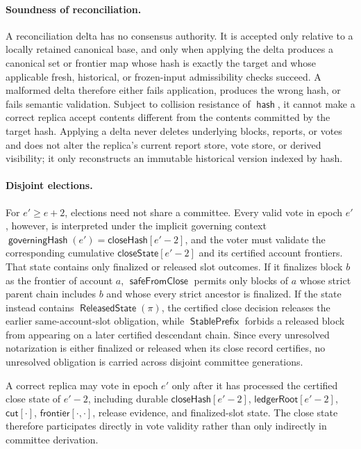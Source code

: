 \documentclass[sigplan,twocolumn,review,anonymous]{acmart}
\newcommand{\func}[1]{\operatorname{\mathsf{#1}}}
\newcommand{\hash}{\func{hash}}
\newcommand{\frontier}{\mathsf{frontier}}
\newcommand{\ledgerRoot}{\mathsf{ledgerRoot}}
\newcommand{\closeHash}{\mathsf{closeHash}}
\newcommand{\closeCut}{\mathsf{cut}}
\newcommand{\closeState}{\mathsf{closeState}}
\newcommand{\governingHash}{\func{governingHash}}
\newcommand{\safeFromClose}{\func{safeFromClose}}
\newcommand{\StablePrefix}{\func{StablePrefix}}
\newcommand{\ReleasedState}{\func{ReleasedState}}
\begin{document}
\paragraph{Soundness of reconciliation.}
A reconciliation delta has no consensus authority.  It is accepted only relative to a locally retained
canonical base, and only when applying the delta produces a canonical set or frontier map whose hash is
exactly the target and whose applicable fresh, historical, or frozen-input admissibility checks succeed.  A malformed delta therefore either
fails application, produces the wrong hash, or fails semantic validation.  Subject to collision
resistance of \(\hash\), it cannot make a correct replica accept contents different from the contents
committed by the target hash.  Applying a delta never deletes underlying blocks, reports, or votes and
does not alter the replica's current report store, vote store, or derived visibility; it only reconstructs
an immutable historical version indexed by hash.

\paragraph{Disjoint elections.}
For \(e'\ge e+2\), elections need not share a committee.  Every valid vote in epoch \(e'\), however,
is interpreted under the implicit governing context
\(\governingHash(e')=\closeHash[e'-2]\), and the voter must validate the corresponding cumulative
\(\closeState[e'-2]\) and its certified account frontiers.  That state contains only finalized or
released slot outcomes.  If it finalizes block \(b\) as the frontier of account \(a\),
\(\safeFromClose\) permits only blocks of \(a\) whose strict parent chain includes \(b\) and whose
every strict ancestor is finalized.  If the state instead contains \(\ReleasedState(\pi)\), the
certified close decision releases the earlier same-account-slot obligation, while \(\StablePrefix\) forbids a
released block from appearing on a later certified descendant chain.  Since every unresolved
notarization is either finalized or released when its close record certifies, no unresolved obligation
is carried across disjoint committee generations.

A correct replica may vote in epoch \(e'\) only after it has processed the certified close state of
\(e'-2\), including durable \(\closeHash[e'-2]\), \(\ledgerRoot[e'-2]\), \(\closeCut[\cdot]\),
\(\frontier[\cdot,\cdot]\), release evidence, and finalized-slot state.  The close state therefore
participates directly in vote validity rather than only indirectly in committee derivation.
\end{document}
